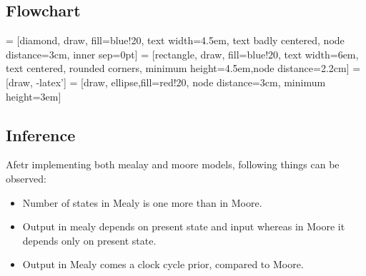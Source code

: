 \documentclass[12pt]{article}
\begin{document}
  \subsection{Flowchart}
   = [diamond, draw, fill=blue!20, 
    text width=4.5em, text badly centered, node distance=3cm, inner sep=0pt]
 = [rectangle, draw, fill=blue!20, 
    text width=6em, text centered, rounded corners, minimum height=4.5em,node distance=2.2cm]
 = [draw, -latex']
 = [draw, ellipse,fill=red!20, node distance=3cm,
    minimum height=3em]
  \begin{center}    
\end{center}
\newpage
\subsection{Inference}
Afetr implementing both mealay and moore models, following things can be observed:
\begin{itemize}
\item Number of states in Mealy is one more than in Moore.
\item Output in mealy depends on present state and input whereas in Moore it depends only on present state.
\item Output in Mealy comes a clock cycle prior, compared to Moore.
\end{itemize}
\end{document}
